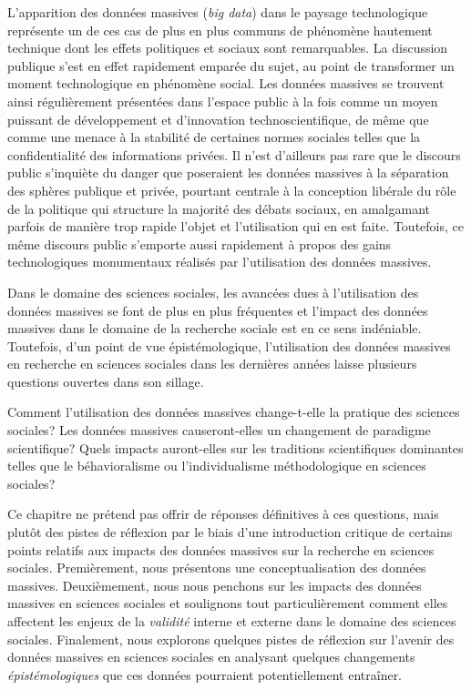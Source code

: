 \documentclass[
  letterpaper,
]{scrbook}
\begin{document}
L'apparition des données massives (\emph{big data}) dans le paysage
technologique représente un de ces cas de plus en plus communs de
phénomène hautement technique dont les effets politiques et sociaux sont
remarquables. La discussion publique s'est en effet rapidement emparée
du sujet, au point de transformer un moment technologique en phénomène
social. Les données massives se trouvent ainsi régulièrement présentées
dans l'espace public à la fois comme un moyen puissant de développement
et d'innovation technoscientifique, de même que comme une menace à la
stabilité de certaines normes sociales telles que la confidentialité des
informations privées. Il n'est d'ailleurs pas rare que le discours
public s'inquiète du danger que poseraient les données massives à la
séparation des sphères publique et privée, pourtant centrale à la
conception libérale du rôle de la politique qui structure la majorité
des débats sociaux, en amalgamant parfois de manière trop rapide l'objet
et l'utilisation qui en est faite. Toutefois, ce même discours public
s'emporte aussi rapidement à propos des gains technologiques monumentaux
réalisés par l'utilisation des données massives.

Dans le domaine des sciences sociales, les avancées dues à l'utilisation
des données massives se font de plus en plus fréquentes et l'impact des
données massives dans le domaine de la recherche sociale est en ce sens
indéniable. Toutefois, d'un point de vue épistémologique, l'utilisation
des données massives en recherche en sciences sociales dans les
dernières années laisse plusieurs questions ouvertes dans son sillage.

Comment l'utilisation des données massives change-t-elle la pratique des
sciences sociales? Les données massives causeront-elles un changement de
paradigme scientifique? Quels impacts auront-elles sur les traditions
scientifiques dominantes telles que le béhavioralisme ou
l'individualisme méthodologique en sciences sociales?

Ce chapitre ne prétend pas offrir de réponses définitives à ces
questions, mais plutôt des pistes de réflexion par le biais d'une
introduction critique de certains points relatifs aux impacts des
données massives sur la recherche en sciences sociales. Premièrement,
nous présentons une conceptualisation des données massives.
Deuxièmement, nous nous penchons sur les impacts des données massives en
sciences sociales et soulignons tout particulièrement comment elles
affectent les enjeux de la \emph{validité} interne et externe dans le
domaine des sciences sociales. Finalement, nous explorons quelques
pistes de réflexion sur l'avenir des données massives en sciences
sociales en analysant quelques changements \emph{épistémologiques} que
ces données pourraient potentiellement entraîner.
\end{document}
